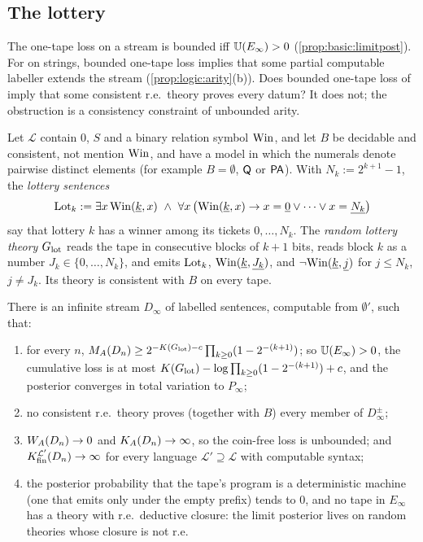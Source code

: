 \subsection{The lottery}\label{sec:logic:lottery}

The one-tape loss on a stream is bounded iff $\mathbb{U}(E_\infty)>0$ (\cref{prop:basic:limitpost}). For \SOIabbr on strings, bounded one-tape loss implies that some partial computable labeller extends the stream (\cref{prop:logic:arity}(b)). Does bounded one-tape loss of \SAIabbr imply that some consistent r.e.\ theory proves every datum? It does not; the obstruction is a consistency constraint of unbounded arity.

Let $\mathcal L$ contain $0$, $S$ and a binary relation symbol $\mathrm{Win}$, and let $B$ be decidable and consistent, not mention $\mathrm{Win}$, and have a model in which the numerals denote pairwise distinct elements (for example $B=\emptyset$, $\mathsf{Q}$ or $\mathsf{PA}$). With $N_k:=2^{k+1}-1$, the \emph{lottery sentences}
\[
\Lot_k:=\exists x\,\Win(\num k,x)\ \wedge\ \forall x\,\big(\Win(\num k,x)\to x=\num0\vee\dots\vee x=\num{N_k}\big)
\]
say that lottery $k$ has a winner among its tickets $0,\dots,N_k$. The \emph{random lottery theory} $G_{\mathrm{lot}}$ reads the tape in consecutive blocks of $k+1$ bits, reads block $k$ as a number $J_k\in\{0,\dots,N_k\}$, and emits $\mathrm{Lot}_k$, $\mathrm{Win}(\underline{k},\underline{J_k})$, and $\neg\mathrm{Win}(\underline{k},\underline{j})$ for $j\le N_k$, $j\ne J_k$. Its theory is consistent with $B$ on every tape.

\begin{theorem}\label{thm:logic:lottery}
There is an infinite stream $D_\infty$ of labelled sentences, computable from $\emptyset'$, such that:
\begin{enumerate}[label=(\alph*),leftmargin=*]
\item for every $n$, $M_{A}(D_n)\ge2^{-K(G_{\mathrm{lot}})-c}\prod_{k\ge0}(1-2^{-(k+1)})$; so $\mathbb{U}(E_\infty)>0$, the cumulative loss is at most $K(G_{\mathrm{lot}})-\log\prod_{k\ge0}(1-2^{-(k+1)})+c$, and the posterior converges in total variation to $P_\infty$;
\item no consistent r.e.\ theory proves (together with $B$) every member of $D_\infty^\pm$;
\item $W_{A}(D_n)\to0$ and $K_{A}(D_n)\to\infty$, so the coin-free loss is unbounded; and $K_{\mathrm{fin}}^{\mathcal L'}(D_n)\to\infty$ for every language $\mathcal L'\supseteq\mathcal L$ with computable syntax;
\item the posterior probability that the tape's program is a deterministic machine (one that emits only under the empty prefix) tends to $0$, and no tape in $E_\infty$ has a theory with r.e.\ deductive closure: the limit posterior lives on random theories whose closure is not r.e.
\end{enumerate}
\end{theorem}

